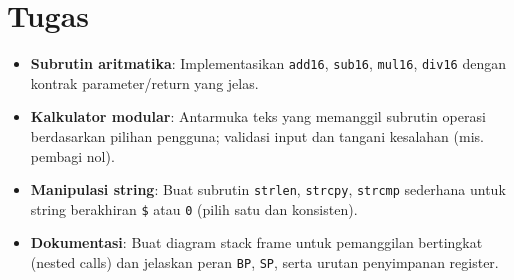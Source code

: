 \documentclass[../main.tex]{subfiles}
\begin{document}
\section{Tugas}
\begin{itemize}
  \item \textbf{Subrutin aritmatika}: Implementasikan \texttt{add16}, \texttt{sub16}, \texttt{mul16}, \texttt{div16} dengan kontrak parameter/return yang jelas.
  \item \textbf{Kalkulator modular}: Antarmuka teks yang memanggil subrutin operasi berdasarkan pilihan pengguna; validasi input dan tangani kesalahan (mis. pembagi nol).
  \item \textbf{Manipulasi string}: Buat subrutin \texttt{strlen}, \texttt{strcpy}, \texttt{strcmp} sederhana untuk string berakhiran \texttt{\$} atau \texttt{0} (pilih satu dan konsisten).
  \item \textbf{Dokumentasi}: Buat diagram stack frame untuk pemanggilan bertingkat (nested calls) dan jelaskan peran \texttt{BP}, \texttt{SP}, serta urutan penyimpanan register.
\end{itemize}
\end{document}
